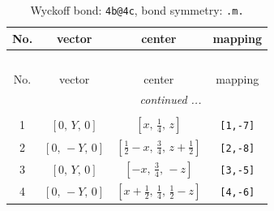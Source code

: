 \documentclass[fleqn,8pt]{jsarticle}
\begin{document}
\renewcommand{\arraystretch}{1.2}
\begin{longtable}{cccc}
\caption{Wyckoff bond: {\tt 4b@4c}, bond symmetry: {\tt .m.}}
 \\
 \hline \hline
No. & vector & center & mapping \\ \hline \endfirsthead

\multicolumn{3}{l}{\tablename\ \thetable{}} \\
 \hline \hline
No. & vector & center & mapping \\ \hline \endhead

 \hline \hline
\multicolumn{3}{r}{\footnotesize\it continued ...} \\ \endfoot

 \hline \hline
\multicolumn{3}{r}{} \\ \endlastfoot

1 & $\left[ 0,\, Y,\, 0 \right]$ & $\left[ x,\, \frac{1}{4},\, z \right]$ & {\tt [1,-7]} \\ \hline
2 & $\left[ 0,\, - Y,\, 0 \right]$ & $\left[ \frac{1}{2} - x,\, \frac{3}{4},\, z + \frac{1}{2} \right]$ & {\tt [2,-8]} \\ \hline
3 & $\left[ 0,\, Y,\, 0 \right]$ & $\left[ - x,\, \frac{3}{4},\, - z \right]$ & {\tt [3,-5]} \\ \hline
4 & $\left[ 0,\, - Y,\, 0 \right]$ & $\left[ x + \frac{1}{2},\, \frac{1}{4},\, \frac{1}{2} - z \right]$ & {\tt [4,-6]} \\
\end{longtable}
\renewcommand{\arraystretch}{1.2}
\end{document}
